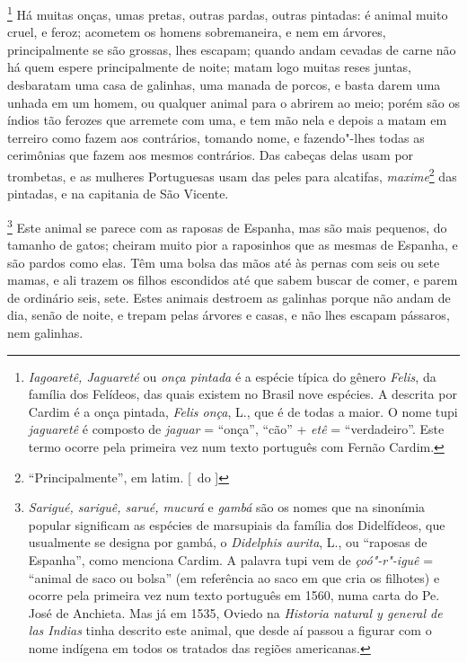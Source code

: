 \footnote{ \textit{Iagoaretê, Jaguareté} ou
\textit{onça pintada } é a espécie típica do gênero \textit{Felis}, da
família dos Felídeos, das quais existem no Brasil nove espécies. A
descrita por Cardim é a onça pintada, \textit{Felis onça}, L., que é de
todas a maior. O nome tupi \textit{jaguaretê} é composto de
\textit{jaguar} = ``onça'', ``cão'' + \textit{etê} = ``verdadeiro''. Este
termo ocorre pela primeira vez num texto português com Fernão Cardim.} 
Há muitas onças, umas pretas, outras pardas, outras pintadas: é animal
muito cruel, e feroz; acometem os homens sobremaneira, e nem em
árvores, principalmente se são grossas, lhes escapam; quando andam
cevadas de carne não há quem espere principalmente de noite; matam logo
muitas reses juntas, desbaratam uma casa de galinhas, uma manada de
porcos, e basta darem uma unhada em um homem, ou qualquer animal para o
abrirem ao meio; porém são os índios tão ferozes que arremete com uma,
e tem mão nela e depois a matam em terreiro como fazem aos contrários,
tomando nome, e fazendo"-lhes todas as cerimônias que fazem aos mesmos
contrários. Das cabeças delas usam por trombetas, e as mulheres
Portuguesas usam das peles para alcatifas, \textit{maxime}\footnote{ ``Principalmente'', em latim. [~do ]} das pintadas, e na
capitania de São Vicente.

\footnote{ \textit{Sarigué, sariguê, sarué,
mucurá} e \textit{gambá} são os nomes que na sinonímia popular
significam as espécies de marsupiais da família dos Didelfídeos, que
usualmente se designa por gambá, o \textit{Didelphis aurita}, 
L., ou ``raposas de Espanha'', como menciona Cardim. A
palavra tupi vem de \textit{çoó"-r"-iguê} = ``animal de saco ou bolsa'' 
(em referência ao saco em que cria os filhotes) e ocorre pela primeira
vez num texto português em 1560, numa carta do Pe. José de
Anchieta. Mas já em 1535, Oviedo na \textit{Historia natural y general
de las Indias} tinha descrito este animal, que desde aí passou a
figurar com o nome indígena em todos os tratados das regiões
americanas.} Este animal se parece com as raposas de Espanha,
mas são mais pequenos, do tamanho de gatos; cheiram muito pior a
raposinhos que as mesmas de Espanha, e são pardos como elas. Têm uma
bolsa das mãos até às pernas com seis ou sete mamas, e ali trazem os
filhos escondidos até que sabem buscar de comer, e parem de ordinário
seis, sete. Estes animais destroem as galinhas porque não andam de dia,
senão de noite, e trepam pelas árvores e casas, e não lhes escapam
pássaros, nem galinhas. 

